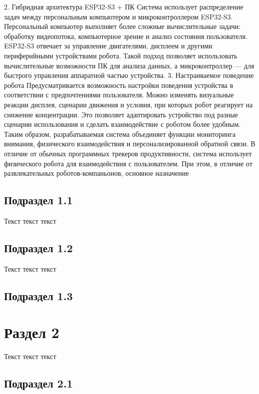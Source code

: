 \documentclass[utf8, russian]{eskdtext}
\let\stdsection\section
\renewcommand \section{\newpage\stdsection}
\begin{document}
2. Гибридная архитектура ESP32-S3 + ПК
Система использует распределение задач между персональным компьютером и микроконтроллером ESP32-S3.
Персональный компьютер выполняет более сложные вычислительные задачи: обработку видеопотока, компьютерное зрение и анализ состояния пользователя. ESP32-S3 отвечает за управление двигателями, дисплеем и другими периферийными устройствами робота.
Такой подход позволяет использовать вычислительные возможности ПК для анализа данных, а микроконтроллер — для быстрого управления аппаратной частью устройства.
3. Настраиваемое поведение робота
Предусматривается возможность настройки поведения устройства в соответствии с предпочтениями пользователя. Можно изменять визуальные реакции дисплея, сценарии движения и условия, при которых робот реагирует на снижение концентрации.
Это позволяет адаптировать устройство под разные сценарии использования и сделать взаимодействие с роботом более удобным.
Таким образом, разрабатываемая система объединяет функции мониторинга внимания, физического взаимодействия и персонализированной обратной связи.
В отличие от обычных программных трекеров продуктивности, система использует физического робота для взаимодействия с пользователем. При этом, в отличие от развлекательных роботов-компаньонов, основное назначение 

\subsection{Подраздел 1.1}

Текст текст текст


\subsection{Подраздел 1.2}

Текст текст текст



\subsection{Подраздел 1.3}


\section{Раздел 2}
Текст текст текст

\subsection{Подраздел 2.1}
\end{document}
